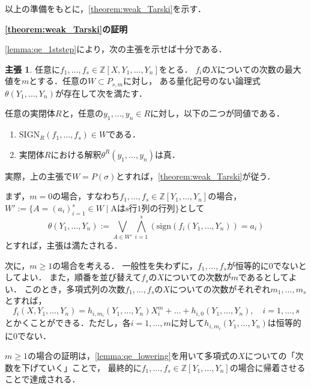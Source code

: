 \documentclass[uplatex, dvipdfmx]{jsarticle}
\makeatletter
\numberwithin{equation}{section}
\renewenvironment{proof}[1][\proofname]{\par
  \pushQED{\qed}%
  \normalfont \topsep6\p@\@plus6\p@\relax
  \trivlist
  \item\relax
  {\bfseries
  #1\@addpunct{.}}\hspace\labelsep\ignorespaces
}{
  \popQED\endtrivlist\@endpefalse
}
\newcommand{\Z}{\mathbb{Z}}
\newcommand{\sign}{\mathrm{sign}}
\newcommand{\SIGN}{\mathrm{SIGN}}
\theoremstyle{definition}
\newtheorem*{claim*}{主張}
\renewcommand{\proofname}{\textbf{証明}}
\makeatother
\begin{document}
以上の準備をもとに，\cref{theorem:weak_Tarski}を示す．

\begin{proof}[\cref{theorem:weak_Tarski}の証明]
     \cref{lemma:qe_1ststep}により，次の主張を示せば十分である．
     \begin{claim*}
          任意に$f_1, \dots, f_s \in \Z[X, Y_1, \dots, Y_n]$をとる．
          $f_i$の$X$についての次数の最大値を$m$とする．任意の$W \subset P_{s,m}$に対し，
          ある量化記号のない論理式$\theta(Y_1, \dots, Y_n)$が存在して次を満たす．

          任意の実閉体$R$と，任意の$y_1, \dots, y_n \in R$に対し，以下の二つが同値である．
          \begin{enumerate}
               \item $\SIGN_R(f_1, \dots, f_s) \in W$である．
               \item 実閉体$R$における解釈$\theta^R(y_1, \dots, y_n)$は真．
          \end{enumerate}
     \end{claim*}
     実際，上の主張で$W = P(\sigma)$とすれば，\cref{theorem:weak_Tarski}が従う．

     まず，$m=0$の場合，すなわち$f_1, \dots, f_s \in \Z[Y_1, \dots, Y_n]$の場合，
     $W':=\{A = (a_i)_{i=1}^s \in W \mid \text{Aはs行1列の行列}\}$として
     \begin{equation}
          \theta(Y_1, \dots, Y_n) := \bigvee_{A \in W'}\bigwedge_{i=1}^s (\sign(f_i(Y_1, \dots, Y_n))=a_i) 
     \end{equation}
     とすれば，主張は満たされる．

     次に，$m \geq 1$の場合を考える．
     一般性を失わずに，$f_1, \dots, f_s$が恒等的に$0$でないとしてよい．
     また，順番を並び替えて$f_s$の$X$についての次数が$m$であるとしてよい．
     このとき，多項式列の次数$f_1, \dots, f_s$の$X$についての次数がそれぞれ$m_1, \dots, m_s$とすれば，
     \begin{equation}
          f_i(X,Y_1, \dots, Y_n) = h_{i,m_i}(Y_1, \dots, Y_n)X^m_i + \dots + h_{i,0}(Y_1, \dots, Y_n), \quad i=1, \dots, s
     \end{equation}
     とかくことができる．ただし，各$i=1, \dots, m$に対して$h_{i,m_i}(Y_1, \dots, Y_n)$は恒等的に$0$でない．

     $m \geq 1$の場合の証明は，\cref{lemma:qe_lowering}を用いて多項式の$X$についての「次数を下げていく」ことで，
     最終的に$f_1, \dots, f_s \in \Z[Y_1, \dots, Y_n]$の場合に帰着させることで達成される．


\end{proof}
\end{document}

